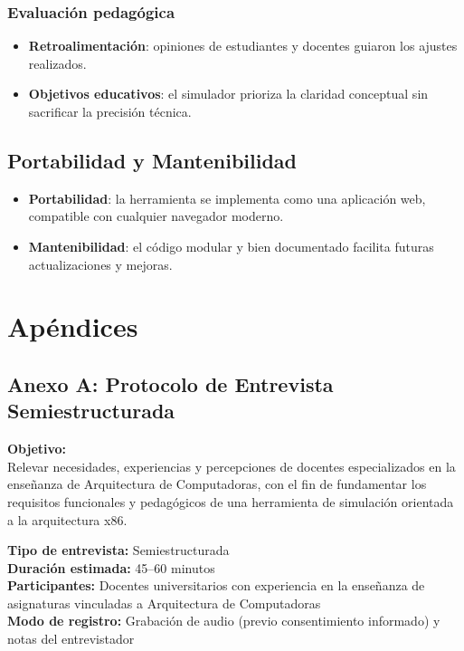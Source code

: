 \documentclass[12pt,oneside]{templates/unerthesis}
\providecommand{\tightlist}{%
  \setlength{\itemsep}{0pt}\setlength{\parskip}{0pt}}
\begin{document}
\hypertarget{evaluaciuxf3n-pedaguxf3gica}{%
\subsection{Evaluación pedagógica}\label{evaluaciuxf3n-pedaguxf3gica}}

\begin{itemize}
\tightlist
\item
  \textbf{Retroalimentación}: opiniones de estudiantes y docentes guiaron los ajustes realizados.
\item
  \textbf{Objetivos educativos}: el simulador prioriza la claridad conceptual sin sacrificar la precisión técnica.
\end{itemize}

\hypertarget{portabilidad-y-mantenibilidad}{%
\section{Portabilidad y Mantenibilidad}\label{portabilidad-y-mantenibilidad}}

\begin{itemize}
\tightlist
\item
  \textbf{Portabilidad}: la herramienta se implementa como una aplicación web, compatible con cualquier navegador moderno.
\item
  \textbf{Mantenibilidad}: el código modular y bien documentado facilita futuras actualizaciones y mejoras.
\end{itemize}

\hypertarget{apuxe9ndices}{%
\chapter*{Apéndices}\label{apuxe9ndices}}

\hypertarget{anexoA}{%
\section{Anexo A: Protocolo de Entrevista Semiestructurada}\label{anexoA}}

\textbf{Objetivo:}\\
Relevar necesidades, experiencias y percepciones de docentes especializados en la enseñanza de Arquitectura de Computadoras, con el fin de fundamentar los requisitos funcionales y pedagógicos de una herramienta de simulación orientada a la arquitectura x86.

\textbf{Tipo de entrevista:} Semiestructurada\\
\textbf{Duración estimada:} 45--60 minutos\\
\textbf{Participantes:} Docentes universitarios con experiencia en la enseñanza de asignaturas vinculadas a Arquitectura de Computadoras\\
\textbf{Modo de registro:} Grabación de audio (previo consentimiento informado) y notas del entrevistador
\end{document}
